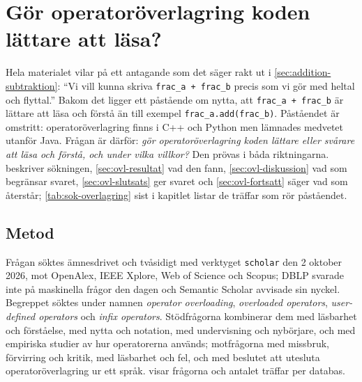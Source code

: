 \chapter{Gör operatoröverlagring koden lättare att läsa?}
\label{app:overlagring}

Hela materialet vilar på ett antagande som det säger rakt ut i
\cref{sec:addition-subtraktion}: \enquote{Vi vill kunna skriva
\texttt{frac_a + frac_b} precis som vi gör med heltal och
flyttal.}  Bakom det ligger ett påstående om nytta, att
\texttt{frac_a + frac_b} är lättare att läsa och förstå än
till exempel \texttt{frac_a.add(frac_b)}.  Påståendet är
omstritt: operatoröverlagring finns i C++ och Python men lämnades
medvetet utanför Java.  Frågan är därför: \emph{gör
operatoröverlagring koden lättare eller svårare att läsa och förstå,
och under vilka villkor?}  Den prövas i båda riktningarna.
 beskriver sökningen, \cref{sec:ovl-resultat} vad
den fann, \cref{sec:ovl-diskussion} vad som begränsar svaret,
\cref{sec:ovl-slutsats} ger svaret och \cref{sec:ovl-fortsatt} säger
vad som återstår; \cref{tab:sok-overlagring} sist i kapitlet listar de
träffar som rör påståendet.

\section{Metod}
\label{sec:ovl-metod}

Frågan söktes ämnesdrivet och tvåsidigt med verktyget \texttt{scholar}
den 2 oktober 2026, mot OpenAlex, IEEE Xplore, Web of Science och Scopus;
DBLP svarade inte på maskinella frågor den dagen och Semantic Scholar
avvisade sin nyckel.  Begreppet söktes under namnen \emph{operator
overloading}, \emph{overloaded operators}, \emph{user-defined
operators} och \emph{infix operators}.  Stödfrågorna kombinerar dem med
läsbarhet och förståelse, med nytta och notation, med undervisning och
nybörjare, och med empiriska studier av hur operatorerna används;
motfrågorna med missbruk, förvirring och kritik, med läsbarhet och fel,
och med beslutet att utesluta operatoröverlagring ur ett språk.
 visar frågorna och antalet träffar per
databas.

